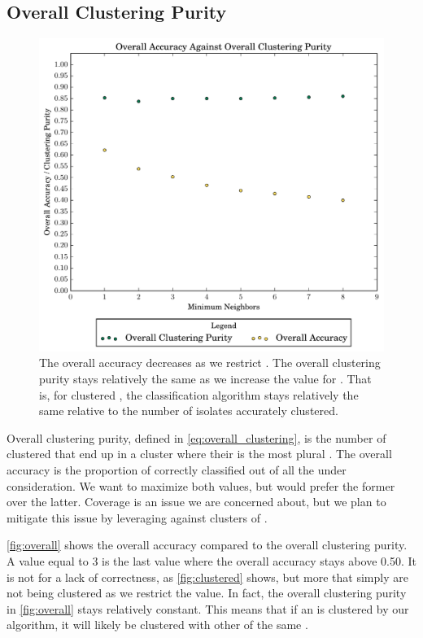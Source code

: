 \subsection{Overall Clustering Purity}
\begin{figure}[ht!]
    \centering
    \includegraphics[width=\linewidth]{figures/bs/neigh_clust_accuracy.pdf}
    \caption{The overall accuracy decreases as we restrict  \minneigh{}. 
    The overall clustering purity stays relatively the same as we increase the value for \minneigh{}. 
    That is, for clustered \isols{}, the classification algorithm stays relatively the same relative to the number of isolates accurately clustered.}
    \label{fig:overall}
\end{figure}

Overall clustering purity, defined in \eqref{eq:overall_clustering}, is the number of \isols{} clustered that end up in a cluster where their \spec{} is the most plural \spec{}. 
The overall accuracy is the proportion of correctly classified \isols{} out of all the \isols{} under consideration.
We want to maximize both values, but would prefer the former over the latter.
Coverage is an issue we are concerned about, but we plan to mitigate this issue by leveraging  \cite{DBLP:conf/bibm/McGovernDKBVG15} against clusters of \isols{}.

\autoref{fig:overall} shows the overall accuracy compared to the overall clustering purity. 
A \minneigh{} value equal to 3 is the last \minneigh{} value where the overall accuracy stays above 0.50.
It is not for a lack of correctness, as \autoref{fig:clustered} shows, but more that \isols{} simply are not being clustered as we restrict the \minneigh{} value.
In fact, the overall clustering purity in \autoref{fig:overall} stays relatively constant.
This means that if an \isol{} is clustered by our algorithm, it will likely be clustered with other \isols{} of the same \spec{}.

